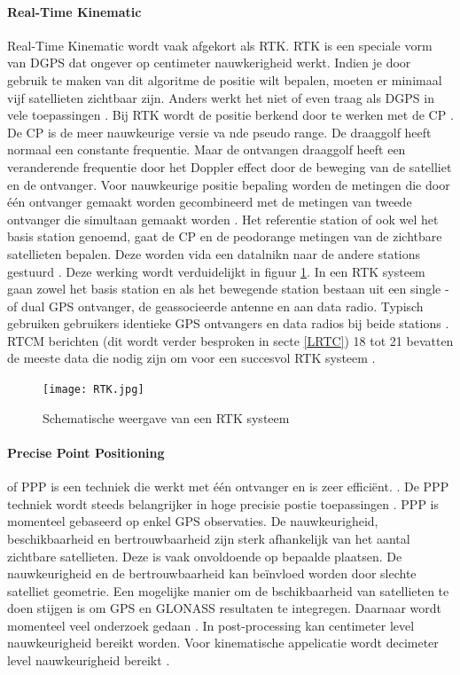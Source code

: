 \paragraph{Real-Time Kinematic}
Real-Time Kinematic wordt vaak afgekort als RTK. RTK is een speciale vorm van DGPS dat ongever op centimeter nauwkerigheid werkt. Indien je door gebruik te maken van dit algoritme de positie wilt bepalen, moeten er minimaal vijf satellieten zichtbaar zijn. Anders werkt het niet of even traag als DGPS in vele toepassingen \cite{LBibRTK}. Bij RTK wordt de positie berkend door te werken met de CP \cite{LBibRTK2}. De CP is de meer nauwkeurige versie va nde pseudo range. De draaggolf heeft normaal een constante frequentie. Maar de ontvangen draaggolf heeft een veranderende frequentie door het Doppler effect door de beweging van de satelliet en de ontvanger. Voor nauwkeurige positie bepaling worden de metingen die door \'e\'en ontvanger gemaakt worden gecombineerd met de metingen van tweede ontvanger die simultaan gemaakt worden \cite{LBibRTK3}. Het referentie station of ook wel het basis station genoemd, gaat de CP en de peodorange metingen van de zichtbare satellieten bepalen. Deze worden vida een datalnikn naar de andere stations gestuurd \cite{LBibDGPS}. Deze werking wordt verduidelijkt in figuur \ref{imgRTK}. In een RTK systeem gaan zowel het basis station en als het bewegende station bestaan uit een single -of dual GPS ontvanger, de geassocieerde antenne en aan data radio. Typisch gebruiken gebruikers identieke GPS ontvangers en data radios bij beide stations \cite{LBibRTK3}. RTCM berichten (dit wordt verder besproken in secte \ref{LRTC}) 18 tot 21 bevatten de meeste data die nodig zijn om voor een succesvol RTK systeem \cite{LBibDGPS} .

\begin{figure}[hpb]
	\texttt{[image: RTK.jpg]}
	\caption{Schematische weergave van een RTK systeem \cite{LBibDGPS}}
	\label{imgRTK}
\end{figure}

\paragraph{Precise Point Positioning}
of PPP is een techniek die werkt met \'e\'en ontvanger en is zeer effici\"ent. \cite{LBibGNSS4}. De PPP techniek wordt steeds belangrijker in hoge precisie postie toepassingen \cite{LBibPPP2}. PPP is momenteel gebaseerd op enkel GPS observaties. De nauwkeurigheid, beschikbaarheid en bertrouwbaarheid zijn sterk afhankelijk van het aantal zichtbare satellieten. Deze is vaak onvoldoende op bepaalde plaatsen. De nauwkeurigheid en de bertrouwbaarheid kan be\"invloed worden door slechte satelliet geometrie. Een mogelijke manier om de bschikbaarheid van satellieten te doen stijgen is om GPS en GLONASS resultaten te integregen. Daarnaar wordt momenteel veel onderzoek gedaan \cite{LBibPPP}. In post-processing kan centimeter level nauwkeurigheid bereikt worden. Voor kinematische appelicatie wordt decimeter level nauwkeurigheid bereikt \cite{LBibGPS2}.  

